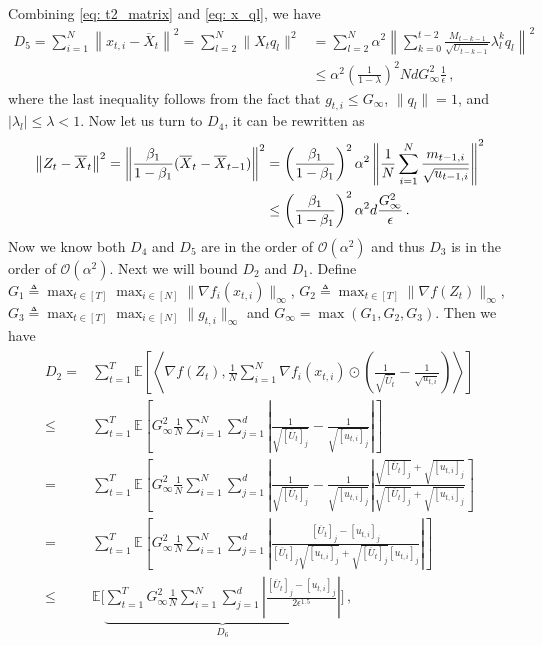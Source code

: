 \documentclass[anon,12pt]{colt2021} %
\begin{document}
Combining \eqref{eq: t2_matrix} and \eqref{eq: x_ql}, we have
\begin{align} \label{eq: T_5_bound}
D_5 = 	\sum_{i=1}^N\left\| {  x_{t,i} -   \overline X_{t}}  \right\|^2  = \sum_{l=2}^N \|X_t q_l\|^2 & =  \sum_{l=2}^N \alpha^2 \left \| \sum_{k=0}^{t-2} \frac{M_{t-k-1}}{\sqrt{U_{t-k-1}}} \lambda_{l}^{k}  q_l\right\|^2 \nonumber \\
& \leq \alpha^2 \left (\frac{1}{1-\lambda} \right)^2 Nd G_{\infty}^2 \frac{1}{\epsilon} \, ,
\end{align}
where the last inequality follows from the fact that $g_{t,i} \leq G_{\infty}$, $\|q_l\| = 1$, and $|\lambda_l| \leq \lambda < 1$.
Now let us turn to $D_4$, it can be rewritten as 
\begin{align}\notag
\left\|  Z_{t} -  \overline X_{t}\right\|^2  = \left\| \frac{\beta_1}{1-\beta_1} (\overline X_t - \overline X_{t-1}) \right \|^2 & =\left( \frac{\beta_1}{1-\beta_1}\right)^2 \alpha^2 \left \|\frac{1}{N}\sum_{i=1}^N \frac{m_{t-1,i}}{\sqrt{u_{t-1,i}}}\right\|^2\\
& \leq \left( \frac{\beta_1}{1-\beta_1}\right)^2 \alpha^2 d \frac{G_{\infty}^2}{\epsilon}\, .
\end{align}
Now we know both $D_4$ and $D_5$ are in the order of  $\mathcal{O}(\alpha^2)$ and thus $D_3$ is in the order of  $\mathcal{O}(\alpha^2)$.
Next we will bound $D_2$ and $D_1$. Define  $G_1   \triangleq \max_{t \in [T]} \max_{i \in [N]} \|\nabla f_i(x_{t,i})\|_{\infty}$, $G_2   \triangleq \max_{t \in [T]}  \|\nabla f(Z_t)\|_{\infty}$, $G_3  \triangleq \max_{t \in [T]} \max_{i \in [N]} \|g_{t,i}\|_{\infty}$ and $G_{\infty} = \max(G_1,G_2,G_3)$.
Then we have 
\begin{align}\label{eq:T_2_bound}
\begin{split}
D_2 =& \sum_{t=1}^T \mathbb E \left [ \left \langle \nabla f( Z_{t}), \frac{1}{N} \sum_{i=1}^N \nabla f_i( x_{t,i})\odot \left( \frac{1}{\sqrt{\overline U_{t}}} -\frac{1}{\sqrt{u_{t,i}}}  \right)  \right \rangle \right]  \\
\leq & \sum_{t=1}^T \mathbb E \left [  G_{\infty}^2  \frac{1}{N} \sum_{i=1}^N \sum_{j=1}^d \left| \frac{1}{\sqrt{[\overline U_{t}]_j}} -\frac{1}{\sqrt{[u_{t,i}]_{j}}}  \right| \right]  \\
= & \sum_{t=1}^T \mathbb E \left [  G_{\infty}^2  \frac{1}{N} \sum_{i=1}^N \sum_{j=1}^d \left| \frac{1}{\sqrt{[\overline U_{t}]_j}} -\frac{1}{\sqrt{[u_{t,i}]_{j}}}  \right| \frac{\sqrt{[\overline U_{t}]_j} + \sqrt{[u_{t,i}]_{j}} }{\sqrt{[\overline U_{t}]_j} + \sqrt{[u_{t,i}]_{j}}} \right] \\
= & \sum_{t=1}^T \mathbb E \left [  G_{\infty}^2  \frac{1}{N} \sum_{i=1}^N \sum_{j=1}^d \left| \frac{[\overline U_{t}]_j - [u_{t,i}]_{j} }{{[\overline U_{t}]_j}\sqrt{[u_{t,i}]_{j}} + \sqrt{[\overline U_{t}]_j}{[u_{t,i}]_{j}}}  \right| \right]  \\
\leq &   \mathbb E \bigg [ \underbrace{ \sum_{t=1}^T  G_{\infty}^2  \frac{1}{N} \sum_{i=1}^N \sum_{j=1}^d \left| \frac{[\overline U_{t}]_j - [u_{t,i}]_{j} }{2 \epsilon^{1.5}}  \right| }_{D_6} \bigg ] \, , 
\end{split}
\end{align}
\end{document}
